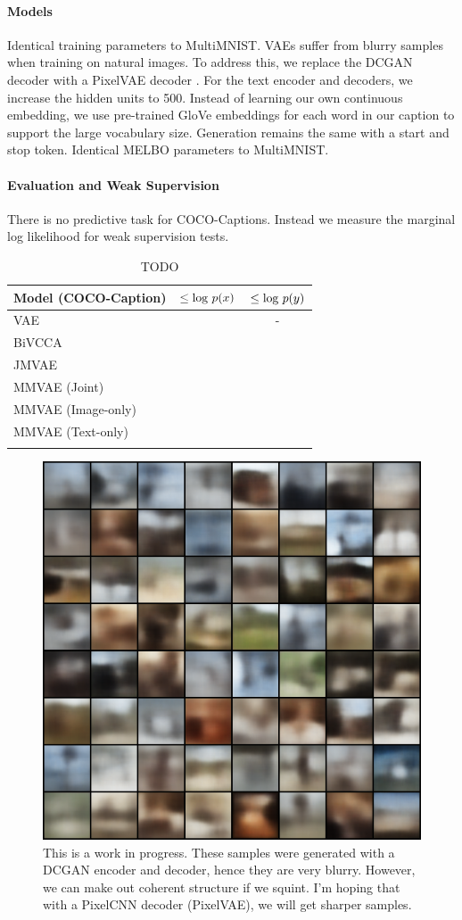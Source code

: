 \documentclass{article}
\begin{document}
\paragraph{Models} Identical training parameters to MultiMNIST. VAEs suffer from blurry samples when training on natural images. To address this, we replace the DCGAN decoder with a PixelVAE decoder \cite{gulrajani2016pixelvae, oord2016pixel}. For the text encoder and decoders, we increase the hidden units to 500. Instead of learning our own continuous embedding, we use pre-trained GloVe embeddings for each word in our caption to support the large vocabulary size. Generation remains the same with a start and stop token. Identical MELBO parameters to MultiMNIST.

\paragraph{Evaluation and Weak Supervision} There is no predictive task for COCO-Captions. Instead we measure the marginal log likelihood for weak supervision tests. 

\begin{table}[!h]
    \centering
    \begin{tabular}{ l | c | c }
        Model (COCO-Caption) & $\leq \textup{log }p(x)$ & $\leq \textup{log }p(y)$ \\
        \hline
        VAE & & - \\
        BiVCCA & &  \\
        JMVAE & & \\
        MMVAE (Joint) & & \\
        MMVAE (Image-only) & & \\
        MMVAE (Text-only) & & \\
        \newline
    \end{tabular}
    \caption{TODO}
    \label{table:mnist:marginal}
\end{table}

\begin{figure}[!h]
    \centering
    \includegraphics[width=.5\linewidth]{coco_mmvae_image_sample.png}
    \caption{This is a work in progress. These samples were generated with a DCGAN encoder and decoder, hence they are very blurry. However, we can make out coherent structure if we squint. I'm hoping that with a PixelCNN decoder (PixelVAE), we will get sharper samples.}
    \label{fig:WIP:coco:samples}
\end{figure}
\end{document}

